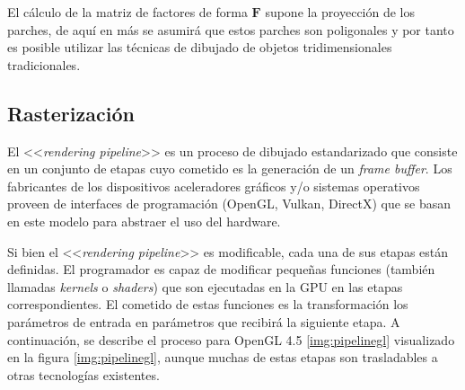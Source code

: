 El cálculo de la matriz de factores de forma $\mathbf{F}$ supone la proyección de los parches, de aquí en más se asumirá que estos parches son poligonales y por tanto es posible utilizar las técnicas de dibujado de objetos tridimensionales tradicionales.

\subsection{Rasterización}

El <<\textit{rendering pipeline}>> es un proceso de dibujado estandarizado que consiste en un conjunto de etapas cuyo cometido es la generación de un \textit{frame buffer}. Los fabricantes de los dispositivos aceleradores gráficos y/o sistemas operativos proveen de interfaces de programación (OpenGL, Vulkan, DirectX) que se basan en este modelo para abstraer el uso del hardware.

Si bien el <<\textit{rendering pipeline}>> es modificable, cada una de sus etapas están definidas.  El programador es capaz de modificar pequeñas funciones (también llamadas \textit{kernels} o \textit{shaders}) que son ejecutadas en la GPU en las etapas correspondientes. El cometido de estas funciones es la transformación los parámetros de entrada en parámetros que recibirá la siguiente etapa. A continuación, se describe el proceso para OpenGL 4.5 \ref{img:pipelinegl} visualizado en la figura \ref{img:pipelinegl}, aunque muchas de estas etapas son trasladables a otras tecnologías existentes.


